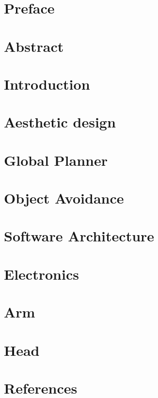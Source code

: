\documentclass[a4paper,10pt,titlepage]{report}
\begin{document}

\newpage


\newpage
{}

\newcommand{\todo}[1]{\textbf{\textsc{\textcolor{red}{[#1]}}}}

\chapter*{Preface}

\label{preface}

\chapter*{Abstract}

\label{abstract}
\newpage

\tableofcontents

\chapter*{Introduction}

\label{introduction}

\chapter*{Aesthetic design}

\label{aesthetic_design}

\chapter*{Global Planner}

\label{global_planner}

\chapter*{Object Avoidance}

\label{object_avoidance}

\chapter*{Software Architecture}
\label{Software Architecture}


\chapter*{Electronics}

\label{electronics}

\chapter*{Arm}

\label{arm}

\chapter*{Head}

\label{head}

\chapter*{References}
\label{references}





\end{document}
